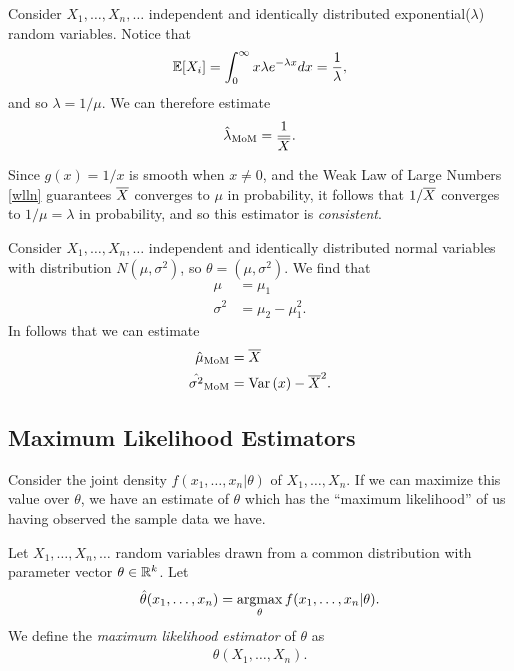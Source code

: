 \begin{exmp}
    Consider $X_1, \ldots, X_n, \ldots$ independent and identically distributed exponential($\lambda$) random variables. Notice that
    \begin{align*}
        \operatorname{\mathbb{E}}\!\left[{X_i}\right] = \int_{0}^{\infty}x\lambda e^{-\lambda x}dx = \frac{1}{\lambda},
    \end{align*}
    and so $\lambda = 1/\mu$. We can therefore estimate
    \begin{align*}
        \hat{\lambda}_{\textrm{MoM}} = \frac{1}{\overline{X}}.
    \end{align*}

    Since $g(x) = 1/x$ is smooth when $x \neq 0$, and the Weak Law of Large Numbers \ref{wlln} guarantees $\overline{X}$ converges to $\mu$ in probability, it follows that $1/\overline{X}$ converges to $1/\mu = \lambda$ in probability, and so this estimator is \emph{consistent}.
\end{exmp}

\begin{exmp}
    Consider $X_1, \ldots, X_n, \ldots$ independent and identically distributed normal variables with distribution $N(\mu, \sigma^2)$, so $\theta = (\mu, \sigma^2)$. We find that
    \begin{align*}
        \mu &= \mu_1 \\
        \sigma^2 &= \mu_2 - \mu_1^2.
    \end{align*}
    In follows that we can estimate
    \begin{align*}
        \hat{\mu}_{\textrm{MoM}} &= \overline{X} \\
        \hat{\sigma^2}_{\textrm{MoM}} &= \operatorname{Var}\left(x\right) - \overline{X}^2.
    \end{align*}
\end{exmp}

\subsection{Maximum Likelihood Estimators}

Consider the joint density $f(x_1,\ldots,x_n|\theta)$ of $X_1, \ldots, X_n$. If we can maximize this value over $\theta$, we have an estimate of $\theta$ which has the ``maximum likelihood'' of us having observed the sample data we have.

\begin{defn}
    Let $X_1, \ldots, X_n, \ldots$ random variables drawn from a common distribution with parameter vector $\theta \in \mathbb{R}^k$. Let
    \begin{align*}
        \hat{\theta}(x_1, \ldots, x_n) = \operatorname*{argmax}_{\theta}f(x_1,\ldots,x_n|\theta).
    \end{align*}
    We define the \emph{maximum likelihood estimator} of $\theta$ as
    \begin{align*}
        \theta(X_1, \ldots, X_n).
    \end{align*}
\end{defn}

